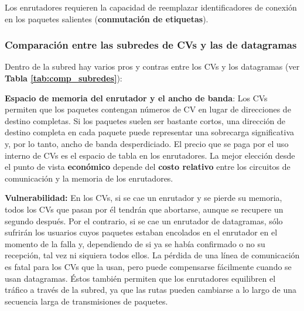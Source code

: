 \documentclass[10pt,a4paper]{article}
\begin{document}
Los enrutadores requieren la capacidad de reemplazar identificadores de conexión en los paquetes salientes (\textbf{conmutación de etiquetas}).

\subsubsection{Comparación entre las subredes de CVs y las de datagramas}

Dentro de la subred hay varios pros y contras entre los CVs y los datagramas (ver \textbf{Tabla \ref{tab:comp_subredes}}):

\begin{description}
\item \textbf{Espacio de memoria del enrutador y el ancho de banda}: Los CVs permiten que los paquetes contengan números de CV en lugar de direcciones de destino completas. Si los paquetes suelen ser bastante cortos, una dirección de destino completa en cada paquete puede representar una sobrecarga significativa y, por lo tanto, ancho de banda desperdiciado. El precio que se paga por el uso interno de CVs es el espacio de tabla en los enrutadores. La mejor elección desde el punto de vista \textbf{económico} depende del \textbf{costo relativo} entre los circuitos de comunicación y la memoria de los enrutadores.

\item \textbf{Vulnerabilidad:} En los CVs, si se cae un enrutador y se pierde su memoria, todos los CVs que pasan por él tendrán que abortarse, aunque se recupere un segundo después. Por el contrario, si se cae un enrutador de datagramas, sólo sufrirán los usuarios cuyos paquetes estaban encolados en el enrutador en el momento de la falla y, dependiendo de si ya se había confirmado o no su recepción, tal vez ni siquiera todos ellos. La pérdida de una línea de comunicación es fatal para los CVs que la usan, pero puede compensarse fácilmente cuando se usan datagramas. Éstos también permiten que los enrutadores equilibren el tráfico a través de la subred, ya que las rutas pueden cambiarse a lo largo de una secuencia larga de transmisiones de paquetes.
\end{description}
\end{document}
